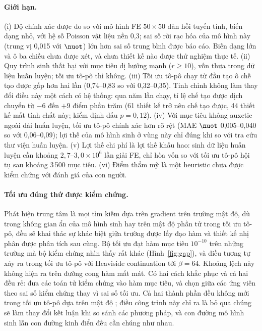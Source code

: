 \paragraph{Giới hạn.}
(i) Độ chính xác được đo so với mô hình FE $50\times50$ đàn hồi tuyến tính,
biến dạng nhỏ, với hệ số Poisson vật liệu nền 0,3; sai số rời rạc hóa của mô
hình này (trung vị 0,015 với $\nuot$) lớn hơn sai số trung bình được báo cáo.
Biến dạng lớn và ô ba chiều chưa được xét, và chưa thiết kế nào được thử
nghiệm thực tế.
(ii) Quy trình sinh thất bại với mục tiêu dị hướng mạnh ($r\ge10$), vốn thưa
trong dữ liệu huấn luyện; tối ưu tô-pô thì không.
(iii) Tối ưu tô-pô chạy từ đầu tạo ô chế tạo được gấp hơn hai lần
(0,74--0,83 so với 0,32--0,35). Tinh chỉnh không làm thay đổi điều này một
cách có hệ thống: qua năm lần chạy, tỉ lệ chế tạo được dịch chuyển từ $-6$
đến $+9$ điểm phần trăm (61 thiết kế trở nên chế tạo được, 44 thiết kế mất
tính chất này; kiểm định dấu $p=0{,}12$).
(iv) Với mục tiêu không auxetic ngoài dải huấn luyện, tối ưu tô-pô chính xác
hơn rõ rệt (MAE $\nuot$ 0,005--0,040 so với 0,06--0,09); lợi thế của mô hình
sinh ở vùng này chỉ đúng khi so với tra cứu thư viện huấn luyện.
(v) Lợi thế chi phí là lợi thế khấu hao: sinh dữ liệu huấn luyện cần khoảng
$2{,}7$--$3{,}0\times10^{6}$ lần giải FE, chỉ hòa vốn so với tối ưu tô-pô hội
tụ sau khoảng 3\,500 mục tiêu.
(vi) Điểm thẩm mỹ là một heuristic chưa được kiểm chứng với đánh giá của con
người.

\paragraph{Tối ưu đúng thứ được kiểm chứng.}
Phát hiện trung tâm là mọi tìm kiếm dựa trên gradient trên trường mật độ, dù
trong không gian ẩn của mô hình sinh hay trên mật độ phần tử trong tối ưu
tô-pô, đều sẽ khai thác sự khác biệt giữa trường được lấy đạo hàm và thiết kế
nhị phân được phân tích sau cùng. Bộ tối ưu đạt hàm mục tiêu $10^{-10}$ trên
những trường mà bộ kiểm chứng nhìn thấy rất khác (Hình~\ref{fig:gap}), và điều
tương tự xảy ra trong tối ưu tô-pô với Heaviside continuation tới $\beta=64$.
Khoảng lệch này không hiện ra trên đường cong hàm mất mát. Có hai cách khắc
phục và cả hai đều rẻ: đưa các toán tử kiểm chứng vào hàm mục tiêu, và chọn
giữa các ứng viên theo sai số kiểm chứng thay vì sai số tối ưu. Cả hai thành
phần đều không mới trong tối ưu tô-pô dựa trên mật độ
\citep{guest2004achieving,wang2011projection}; điều công trình này chỉ ra là bỏ
qua chúng sẽ làm thay đổi kết luận khi so sánh các phương pháp, và con đường
mô hình sinh lẫn con đường kinh điển đều cần chúng như nhau.

